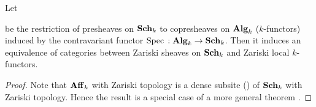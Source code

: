 \begin{theorem}\label{theorem:sheavesonschemesarelocalkfunctors}
Let
\begin{center}
\end{center}
be the restriction of presheaves on $\mathbf{Sch}_k$ to copresheaves on $\mathbf{Alg}_k$ ($k$-functors) induced by the contravariant functor $\mathrm{Spec}\,:\mathbf{Alg}_k\rightarrow \mathbf{Sch}_k$. Then it induces an equivalence of categories between Zariski sheaves on $\mathbf{Sch}_k$ and Zariski local $k$-functors.
\end{theorem}
\begin{proof}
Note that $\mathbf{Aff}_k$ with Zariski topology is a dense subsite ({\cite[definition 4.4]{Sheaves}}) of $\mathbf{Sch}_k$ with Zariski topology. Hence the result is a special case of a more general theorem {\cite[Theorem 4.6]{Sheaves}}. 
\end{proof}

